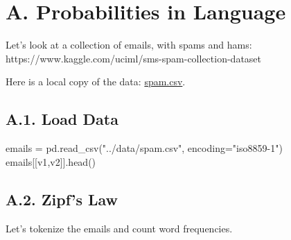 \documentclass[
  letterpaper,
]{scrbook}
\newenvironment{Shaded}{\begin{snugshade}}{\end{snugshade}}
\newcommand{\NormalTok}[1]{\textcolor[rgb]{0.00,0.23,0.31}{#1}}
\newcommand{\OperatorTok}[1]{\textcolor[rgb]{0.37,0.37,0.37}{#1}}
\newcommand{\StringTok}[1]{\textcolor[rgb]{0.13,0.47,0.30}{#1}}
\begin{document}
\section*{A. Probabilities in
Language}\label{a.-probabilities-in-language}


Let's look at a collection of emails, with spams and hams:
https://www.kaggle.com/uciml/sms-spam-collection-dataset

Here is a local copy of the data: \href{../data/spam.csv}{spam.csv}.

\subsection*{A.1. Load Data}\label{a.1.-load-data}

\begin{Shaded}
\begin{Highlighting}[]
\NormalTok{emails }\OperatorTok{=}\NormalTok{ pd.read\_csv(}\StringTok{"../data/spam.csv"}\NormalTok{, encoding}\OperatorTok{=}\StringTok{"iso8859{-}1"}\NormalTok{)}
\NormalTok{emails[[}\StringTok{\textquotesingle{}v1\textquotesingle{}}\NormalTok{,}\StringTok{\textquotesingle{}v2\textquotesingle{}}\NormalTok{]].head()}
\end{Highlighting}
\end{Shaded}

\subsection*{A.2. Zipf's Law}\label{a.2.-zipfs-law}

Let's tokenize the emails and count word frequencies.
\end{document}
